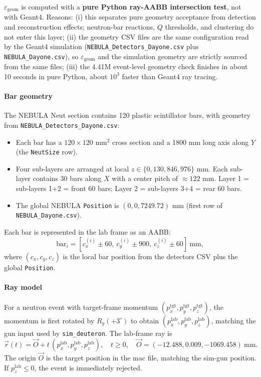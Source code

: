 \documentclass[a4paper,11pt]{article}
\begin{document}
$\varepsilon_\mathrm{geom}$ is computed with a \textbf{pure Python ray-AABB
intersection test}, not with Geant4. Reasons:
(i) this separates pure geometry acceptance from detection and reconstruction
effects; neutron-bar reactions, $Q$ thresholds, and clustering do not enter this
layer;
(ii) the geometry CSV files are the same configuration read by the Geant4
simulation (\texttt{NEBULA\_Detectors\_Dayone.csv} plus
\texttt{NEBULA\_Dayone.csv}), so $\varepsilon_\mathrm{geom}$ and the simulation
geometry are strictly sourced from the same files;
(iii) the 4.41M event-level geometry check finishes in about 10 seconds in pure
Python, about $10^3$ faster than Geant4 ray tracing.

\paragraph{Bar geometry}
The NEBULA Neut section contains 120 plastic scintillator bars, with geometry
from \texttt{NEBULA\_Detectors\_Dayone.csv}:
\begin{itemize}
    \item Each bar has a $120 \times 120$ mm$^2$ cross section and a
          1800 mm long axis along $Y$ (the \texttt{NeutSize} row).
    \item Four sub-layers are arranged at local
          $z \in \{0,130,846,976\}$ mm. Each sub-layer contains 30 bars along
          $X$ with a center pitch of $\approx 122$ mm.
          Layer 1 = sub-layers 1+2 = front 60 bars; Layer 2 = sub-layers 3+4
          = rear 60 bars.
    \item The global NEBULA \texttt{Position} is $(0,0,7249.72)$ mm
          (first row of \texttt{NEBULA\_Dayone.csv}).
\end{itemize}
Each bar is represented in the lab frame as an AABB:
\[
    \mathrm{bar}_i =
    [c_x^{(i)} \pm 60,\ c_y^{(i)} \pm 900,\ c_z^{(i)} \pm 60]\ \mathrm{mm},
\]
where $(c_x,c_y,c_z)$ is the local bar position from the detectors CSV plus the
global \texttt{Position}.

\paragraph{Ray model}
For a neutron event with target-frame momentum
$(p_x^\mathrm{tgt},p_y^\mathrm{tgt},p_z^\mathrm{tgt})$, the momentum is first
rotated by $R_y(+3^\circ)$ to obtain
$(p_x^\mathrm{lab},p_y^\mathrm{lab},p_z^\mathrm{lab})$, matching the gun input
used by \texttt{sim\_deuteron}. The lab-frame ray is
\[
\vec r(t) = \vec O + t\,(p_x^\mathrm{lab},p_y^\mathrm{lab},p_z^\mathrm{lab}),
\quad t \geq 0,
\quad \vec O = (-12.488,0.009,-1069.458)\ \mathrm{mm}.
\]
The origin $\vec O$ is the target position in the mac file, matching the sim-gun
position. If $p_z^\mathrm{lab}\leq 0$, the event is immediately rejected.
\end{document}
